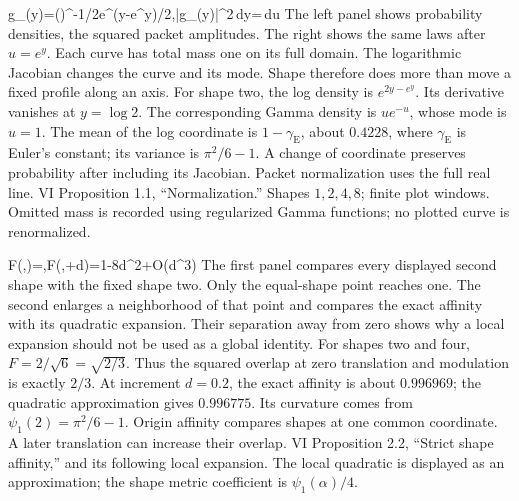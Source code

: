 {g_\alpha(y)=\Gamma(\alpha)^{-1/2}e^{(\alpha y-e^y)/2},\qquad |g_\alpha(y)|^2\,dy=\,du}
{The left panel shows probability densities, the squared packet amplitudes. The right shows the same laws after $u=e^y$. Each curve has total mass one on its full domain. The logarithmic Jacobian changes the curve and its mode. Shape therefore does more than move a fixed profile along an axis.}
{For shape two, the log density is $e^{2y-e^y}$. Its derivative vanishes at $y=\log2$. The corresponding Gamma density is $u e^{-u}$, whose mode is $u=1$. The mean of the log coordinate is $1-\gamma_{\mathrm E}$, about $0.4228$, where $\gamma_{\mathrm E}$ is Euler's constant; its variance is $\pi^2/6-1$.}
{A change of coordinate preserves probability after including its Jacobian. Packet normalization uses the full real line.}
{VI Proposition 1.1, ``Normalization.'' Shapes $1,2,4,8$; finite plot windows. Omitted mass is recorded using regularized Gamma functions; no plotted curve is renormalized.}

{F(\alpha,\gamma)=,\qquad F(\alpha,\alpha+d)=1-8d^2+O(d^3)}
{The first panel compares every displayed second shape with the fixed shape two. Only the equal-shape point reaches one. The second enlarges a neighborhood of that point and compares the exact affinity with its quadratic expansion. Their separation away from zero shows why a local expansion should not be used as a global identity.}
{For shapes two and four, $F=2/\sqrt6=\sqrt{2/3}$. Thus the squared overlap at zero translation and modulation is exactly $2/3$. At increment $d=0.2$, the exact affinity is about $0.996969$; the quadratic approximation gives $0.996775$. Its curvature comes from $\psi_1(2)=\pi^2/6-1$.}
{Origin affinity compares shapes at one common coordinate. A later translation can increase their overlap.}
{VI Proposition 2.2, ``Strict shape affinity,'' and its following local expansion. The local quadratic is displayed as an approximation; the shape metric coefficient is $\psi_1(\alpha)/4$.}

